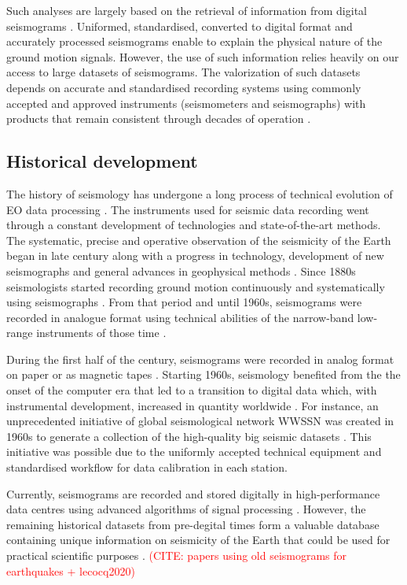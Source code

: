 \documentclass[informatics,article,submit,moreauthors,pdftex]{Definitions/mdpi}
\newcommand{\CITE}[1]{\textcolor{red}{(CITE: #1)}}
\begin{document}
Such analyses are largely based on the retrieval of information from digital seismograms \cite{Claerbout1992}. Uniformed, standardised, converted to digital format and accurately processed seismograms enable to explain the physical nature of the ground motion signals. However, the use of such information relies heavily on our access to large datasets of seismograms. 
The valorization of such datasets depends on  accurate and standardised recording systems using commonly accepted and approved instruments (seismometers and seismographs) with products that remain consistent through decades of operation \cite{UdiasBuforn2017}. 

\subsection{Historical development}
The history of seismology has undergone a long process of technical evolution of \ac{EO} data processing \cite{DeweyByerly1979,Agnew}. The instruments used for seismic data recording went through a constant development of technologies and state-of-the-art methods. The systematic, precise and operative observation of the seismicity of the Earth began in late  century along with a progress in technology, development of new seismographs and general advances in geophysical methods \cite{SchweitzerLee2003}. Since 1880s seismologists started recording ground motion continuously and systematically using seismographs \cite{SchweitzerLee2003}. From that period and until 1960s, seismograms were recorded in analogue format using technical abilities of the narrow-band low-range instruments of those time \cite{Batlloetal2008}.

During the first half of the  century, seismograms were recorded in analog format on  paper \cite[e.g., ][]{Wangetal2014} or as magnetic tapes \cite{Anetal2015}. Starting 1960s, seismology benefited from the the onset of the computer era that led to a transition to digital data which, with instrumental development, increased in quantity worldwide \cite{Engdahl2002}. For instance, an unprecedented initiative of global seismological network \ac{WWSSN} was created in 1960s to generate a collection of the high-quality big seismic datasets \citep{OliverMurphy,Ammon2010}. This initiative was possible due to the uniformly accepted technical equipment and standardised workflow for data calibration in each station. 

Currently, seismograms are recorded and stored digitally in high-performance data centres using advanced algorithms of signal processing \cite{Heiner}. However, the remaining historical datasets from pre-degital times form a valuable database containing unique information on seismicity of the Earth that could be used for practical scientific purposes \cite{Ambraseys1983}. \CITE{papers using old seismograms for earthquakes + lecocq2020} 
\end{document}
